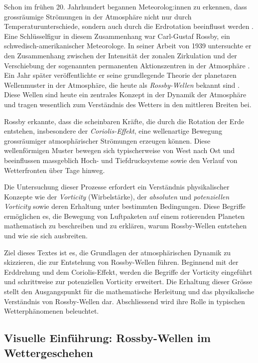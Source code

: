 

Schon im frühen 20. Jahrhundert begannen Meteorolog:innen zu erkennen, dass grossräumige Strömungen in der Atmosphäre nicht nur durch Temperaturunterschiede, sondern auch durch die Erdrotation beeinflusst werden \cite{https://doi.org/10.1002/wcc.95}.
Eine Schlüsselfigur in diesem Zusammenhang war Carl-Gustaf Rossby, ein schwedisch-amerikanischer Meteorologe.
In seiner Arbeit von 1939 untersuchte er den Zusammenhang zwischen der Intensität der zonalen Zirkulation und der Verschiebung der sogenannten permanenten Aktionszentren in der Atmosphäre \cite{rossby:1939relation}.
Ein Jahr später veröffentlichte er seine grundlegende Theorie der planetaren Wellenmuster in der Atmosphäre, die heute als \emph{Rossby-Wellen} bekannt sind \cite{rossby:1940planetary}.
Diese Wellen sind heute ein zentrales Konzept in der Dynamik der Atmosphäre und tragen wesentlich zum Verständnis des Wetters in den mittleren Breiten bei.

Rossby erkannte, dass die scheinbaren Kräfte, die durch die Rotation der Erde entstehen, insbesondere der \emph{Coriolis-Effekt}, eine wellenartige Bewegung grossräumiger atmosphärischer Strömungen erzeugen können.
Diese wellenförmigen Muster bewegen sich typischerweise von West nach Ost und beeinflussen massgeblich Hoch- und Tiefdrucksysteme sowie den Verlauf von Wetterfronten über Tage hinweg.

Die Untersuchung dieser Prozesse erfordert ein Verständnis physikalischer Konzepte wie der \emph{Vorticity} (Wirbelstärke), der \emph{absoluten} und \emph{potenziellen Vorticity} sowie deren Erhaltung unter bestimmten Bedingungen.
Diese Begriffe ermöglichen es, die Bewegung von Luftpaketen auf einem rotierenden Planeten mathematisch zu beschreiben und zu erklären, warum Rossby-Wellen entstehen und wie sie sich ausbreiten.

Ziel dieses Textes ist es, die Grundlagen der atmosphärischen Dynamik zu skizzieren, die zur Entstehung von Rossby-Wellen führen.
Beginnend mit der Erddrehung und dem Coriolis-Effekt, werden die Begriffe der Vorticity eingeführt und schrittweise zur potenziellen Vorticity erweitert.
Die Erhaltung dieser Grösse stellt den Ausgangspunkt für die mathematische Herleitung und das physikalische Verständnis von Rossby-Wellen dar.
Abschliessend wird ihre Rolle in typischen Wetterphänomenen beleuchtet.


\subsection{Visuelle Einführung: Rossby-Wellen im Wettergeschehen}


